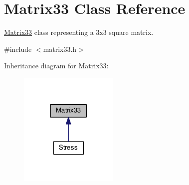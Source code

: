 \hypertarget{classMatrix33}{\section{Matrix33 Class Reference}
\label{de/d82/classMatrix33}
}


\hyperlink{classMatrix33}{Matrix33} class representing a 3x3 square matrix.  




{\ttfamily \#include $<$matrix33.\-h$>$}



Inheritance diagram for Matrix33\-:\nopagebreak
\begin{figure}[H]
\begin{center}
\leavevmode
\includegraphics[width=134pt]{dc/dfe/classMatrix33__inherit__graph}
\end{center}
\end{figure}
